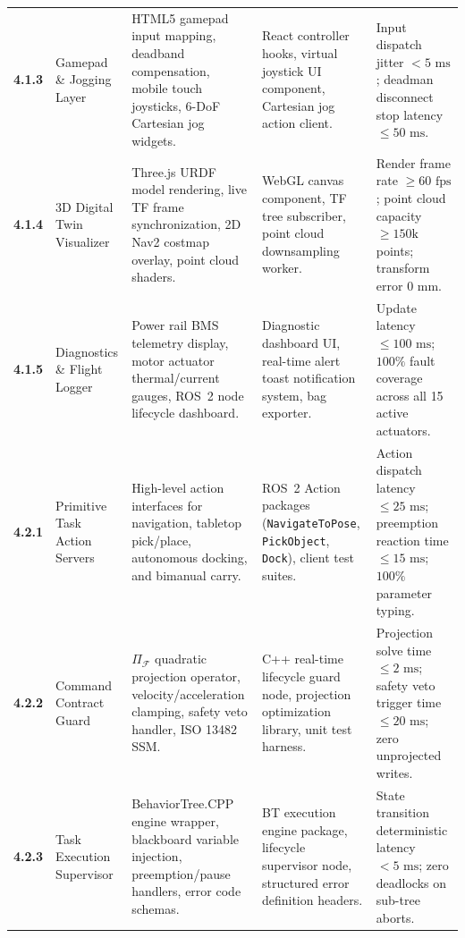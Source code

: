 \documentclass[10pt,a4paper]{article}
\begin{document}
\begin{small}
\begin{longtable}{@{}p{} p{} p{} p{} p{}@{}}
\textbf{4.1.3} & 
Gamepad \& Jogging Layer & 
HTML5 gamepad input mapping, deadband compensation, mobile touch joysticks, 6-DoF Cartesian jog widgets. & 
React controller hooks, virtual joystick UI component, Cartesian jog action client. & 
Input dispatch jitter $<5\text{ ms}$; deadman disconnect stop latency $\le 50\text{ ms}$. \\
\addlinespace[3pt]

\textbf{4.1.4} & 
3D Digital Twin Visualizer & 
Three.js URDF model rendering, live TF frame synchronization, 2D Nav2 costmap overlay, point cloud shaders. & 
WebGL canvas component, TF tree subscriber, point cloud downsampling worker. & 
Render frame rate $\ge 60\text{ fps}$; point cloud capacity $\ge 150\text{k}$ points; transform error $0\text{ mm}$. \\
\addlinespace[3pt]

\textbf{4.1.5} & 
Diagnostics \& Flight Logger & 
Power rail BMS telemetry display, motor actuator thermal/current gauges, ROS~2 node lifecycle dashboard. & 
Diagnostic dashboard UI, real-time alert toast notification system, bag exporter. & 
Update latency $\le 100\text{ ms}$; $100\%$ fault coverage across all 15 active actuators. \\
\midrule

\textbf{4.2.1} & 
Primitive Task Action Servers & 
High-level action interfaces for navigation, tabletop pick/place, autonomous docking, and bimanual carry. & 
ROS~2 Action packages (\texttt{NavigateToPose}, \texttt{PickObject}, \texttt{Dock}), client test suites. & 
Action dispatch latency $\le 25\text{ ms}$; preemption reaction time $\le 15\text{ ms}$; $100\%$ parameter typing. \\
\addlinespace[3pt]

\textbf{4.2.2} & 
Command Contract Guard & 
$\Pi_{\mathcal{F}}$ quadratic projection operator, velocity/acceleration clamping, safety veto handler, ISO 13482 SSM. & 
C++ real-time lifecycle guard node, projection optimization library, unit test harness. & 
Projection solve time $\le 2\text{ ms}$; safety veto trigger time $\le 20\text{ ms}$; zero unprojected writes. \\
\addlinespace[3pt]

\textbf{4.2.3} & 
Task Execution Supervisor & 
BehaviorTree.CPP engine wrapper, blackboard variable injection, preemption/pause handlers, error code schemas. & 
BT execution engine package, lifecycle supervisor node, structured error definition headers. & 
State transition deterministic latency $<5\text{ ms}$; zero deadlocks on sub-tree aborts. \\
\midrule


\end{longtable}
\end{small}
\end{document}
